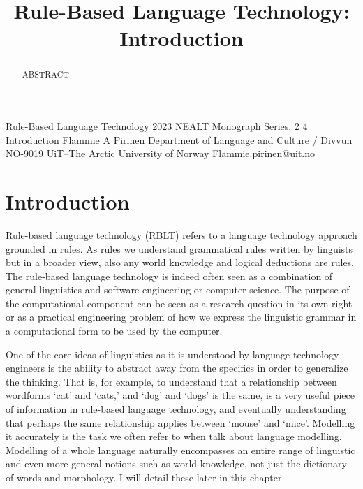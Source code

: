 \documentclass[free]{flammie}
\newif\ifcameraready
\begin{document}
\title{Rule-Based Language Technology:  Introduction }


\ifcameraready
\author{Flammie A Pirinen \\
    \url{flammie.pirinen@uit.no} \\
    Divvun, UiT Norgga árktalaš universitehta \\
}
\fi

\maketitle
\begin{abstract}

    ABSTRACT
\end{abstract}

Rule-Based Language Technology
2023
NEALT Monograph Series, 2
4
Introduction
Flammie A Pirinen
Department of Language and Culture / Divvun
NO-9019 UiT–The Arctic University of Norway
Flammie.pirinen@uit.no

\section{Introduction}

Rule-based language technology (RBLT) refers to a language technology approach
grounded in rules. As rules we understand grammatical rules written by linguists
but in a broader view, also any world knowledge and logical deductions are
rules. The rule-based language technology is indeed often seen as a combination
of general linguistics and software engineering or computer science. The purpose
of the computational component can be seen as a research question in its own
right or as a practical engineering problem of how we express the linguistic
grammar in a computational form to be used by the computer.

One of the core ideas of linguistics as it is understood by language technology
engineers is the ability to abstract away from the specifics in order to
generalize the thinking.  That is, for example, to understand that a
relationship between wordforms ‘cat’ and ‘cats,’ and ‘dog’ and ‘dogs’ is the
same, is a very useful piece of information in rule-based language technology,
and eventually understanding that perhaps the same relationship applies between
‘mouse’ and ‘mice’. Modelling it accurately is the task we often refer to when
talk about language modelling.  Modelling of a whole language naturally
encompasses an entire range of linguistic and even more general notions such as
world knowledge, not just the dictionary of words and morphology. I will detail
these later in this chapter.
\end{document}
